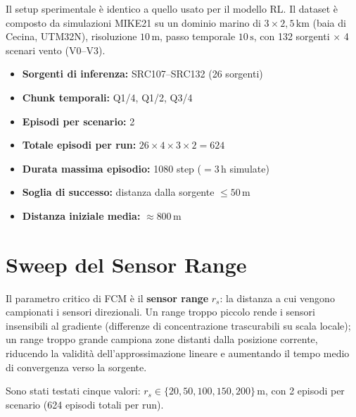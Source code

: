 \documentclass[12pt, a4paper]{article}
\begin{document}
Il setup sperimentale \`e identico a quello usato per il modello RL.
Il dataset \`e composto da simulazioni MIKE21 su un dominio marino di
$3 \times 2{,}5\,\text{km}$ (baia di Cecina, UTM32N), risoluzione $10\,\text{m}$,
passo temporale $10\,\text{s}$, con 132 sorgenti $\times$ 4 scenari vento (V0--V3).

\begin{itemize}
    \item \textbf{Sorgenti di inferenza:} SRC107--SRC132 (26 sorgenti)
    \item \textbf{Chunk temporali:} Q1/4, Q1/2, Q3/4
    \item \textbf{Episodi per scenario:} 2
    \item \textbf{Totale episodi per run:} $26 \times 4 \times 3 \times 2 = 624$
    \item \textbf{Durata massima episodio:} 1080 step ($= 3\,\text{h}$ simulate)
    \item \textbf{Soglia di successo:} distanza dalla sorgente $\leq 50\,\text{m}$
    \item \textbf{Distanza iniziale media:} $\approx 800\,\text{m}$
\end{itemize}

\section{Sweep del Sensor Range}

Il parametro critico di FCM \`e il \textbf{sensor range} $r_s$: la distanza a cui
vengono campionati i sensori direzionali.
Un range troppo piccolo rende i sensori insensibili al gradiente (differenze di
concentrazione trascurabili su scala locale); un range troppo grande campiona zone
distanti dalla posizione corrente, riducendo la validit\`a dell'approssimazione lineare
e aumentando il tempo medio di convergenza verso la sorgente.

Sono stati testati cinque valori: $r_s \in \{20, 50, 100, 150, 200\}\,\text{m}$,
con 2 episodi per scenario (624 episodi totali per run).
\end{document}

